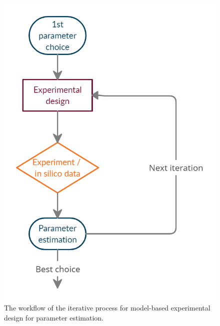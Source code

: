 \documentclass[10pt,A4paper]{article}
\begin{document}
\begin{figure}[H]
    \centering
    \includegraphics[scale=0.25]{Figures/scheme.png}
    \caption{{\footnotesize The workflow of the iterative process for model-based experimental design for parameter estimation.}}
    \label{fig:expdesign_scheme}
\end{figure}

%
%
%
\end{document}
